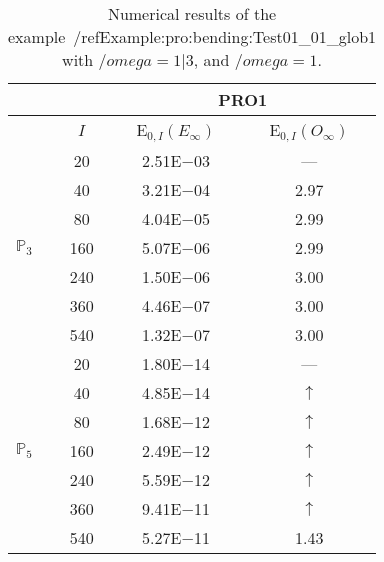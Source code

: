 \begin{table}[H]
\caption{Numerical results of the example~/ref{Example:pro:bending:Test01_01_glob1} with $/omega=1|3$, and $/omega=1$.}
\setlength{\tabcolsep}{5pt}
\centering
\begin{tabular}{@{}l c c c@{}}
\toprule
 &  & \multicolumn{2}{c}{PRO1}\\
\midrule
 & $I$ & E$_{0,I}(E_{\infty})$ & E$_{0,I}(O_{\infty})$\\
\midrule
\multirow{7}{*}{$\mathbb{P}_{3}$}
 & 20 & 2.51E$-$03 & ---\\
 & 40 & 3.21E$-$04 & 2.97\\
 & 80 & 4.04E$-$05 & 2.99\\
 & 160 & 5.07E$-$06 & 2.99\\
 & 240 & 1.50E$-$06 & 3.00\\
 & 360 & 4.46E$-$07 & 3.00\\
 & 540 & 1.32E$-$07 & 3.00\\
\midrule
\multirow{7}{*}{$\mathbb{P}_{5}$}
 & 20 & 1.80E$-$14 & ---\\
 & 40 & 4.85E$-$14 & $\uparrow$\\
 & 80 & 1.68E$-$12 & $\uparrow$\\
 & 160 & 2.49E$-$12 & $\uparrow$\\
 & 240 & 5.59E$-$12 & $\uparrow$\\
 & 360 & 9.41E$-$11 & $\uparrow$\\
 & 540 & 5.27E$-$11 & 1.43\\
\bottomrule
\end{tabular}
\label{Table:pRO:test_01_01_test10_pro2}
\end{table}
